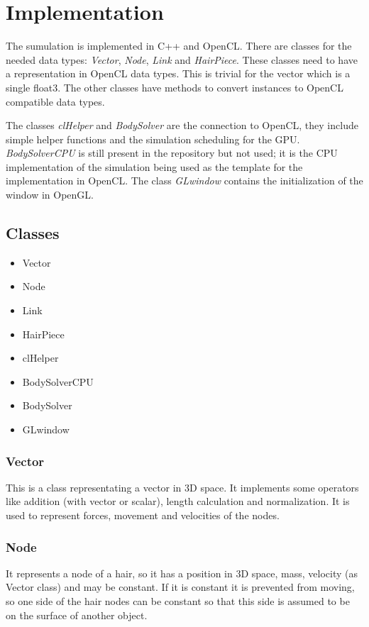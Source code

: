 \documentclass[11pt,a4paper]{scrartcl}
\begin{document}
\section{Implementation}
The sumulation is implemented in C++ and OpenCL. There are classes for the needed data types: \textit{Vector}, \textit{Node}, \textit{Link} and \textit{HairPiece}. These classes need to have a representation in OpenCL data types. This is trivial for the vector which is a single float3. The other classes have methods to convert instances to OpenCL compatible data types.

The classes \textit{clHelper} and \textit{BodySolver} are the connection to OpenCL, they include simple helper functions and the simulation scheduling for the GPU. \textit{BodySolverCPU} is still present in the repository but not used; it is the CPU implementation of the simulation being used as the template for the implementation in OpenCL. The class \textit{GLwindow} contains the initialization of the window in OpenGL.

\subsection{Classes}
\begin{itemize}
	\item Vector
	\item Node
	\item Link
	\item HairPiece
	\item clHelper
	\item BodySolverCPU
	\item BodySolver
	\item GLwindow
\end{itemize}

\subsubsection{Vector}
This is a class representating a vector in 3D space. It implements some operators like addition (with vector or scalar), length calculation and normalization.
It is used to represent forces, movement and velocities of the nodes.

\subsubsection{Node}
It represents a node of a hair, so it has a position in 3D space, mass, velocity (as Vector class) and may be constant. If it is constant it is prevented from moving, so one side of the hair nodes can be constant so that this side is assumed to be on the surface of another object.
\end{document}
